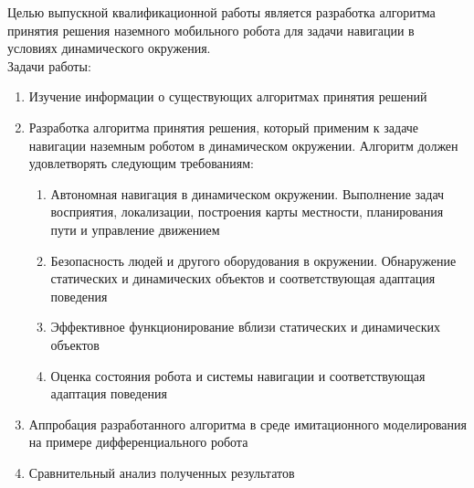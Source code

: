 \begin{small}
\noindent
Целью выпускной квалификационной работы является разработка алгоритма принятия решения наземного мобильного робота для задачи навигации в условиях динамического окружения. \\

\noindent
Задачи работы:
    \begin{enumerate}
        \item Изучение информации о существующих алгоритмах принятия решений
        \item Разработка алгоритма принятия решения, который применим к задаче навигации наземным роботом в динамическом окружении. Алгоритм должен удовлетворять следующим требованиям:
        \begin{enumerate}
            \item Автономная навигация в динамическом окружении. Выполнение задач восприятия, локализации, построения карты местности, планирования пути и управление движением
            \item Безопасность людей и другого оборудования в окружении. Обнаружение статических и динамических объектов и соответствующая адаптация поведения
            \item Эффективное функционирование вблизи статических и динамических объектов
            \item Оценка состояния робота и системы навигации и соответствующая адаптация поведения
        \end{enumerate}
        \item Аппробация разработанного алгоритма в среде имитационного моделирования на примере дифференциального робота
        \item Сравнительный анализ полученных результатов
    \end{enumerate}


\end{small}
